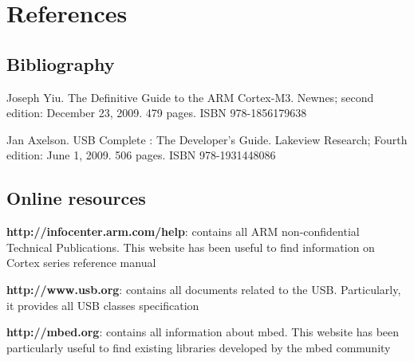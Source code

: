 \documentclass[pdftex,10pt,a4paper]{report}
\newenvironment{packed_item}{
\begin{itemize}
  \setlength{\itemsep}{1pt}
  \setlength{\parskip}{0pt}
  \setlength{\parsep}{0pt}
}{\end{itemize}}
\begin{document}
\chapter*{References}
\section*{Bibliography}
\begin{packed_item}
	\item Joseph Yiu. The Definitive Guide to the ARM Cortex-M3. Newnes; second edition: December 23, 2009. 479 pages. ISBN 978-1856179638
	\item Jan Axelson. USB Complete : The Developer's Guide. Lakeview Research; Fourth edition: June 1, 2009. 506 pages. ISBN 978-1931448086
\end{packed_item}


\section*{Online resources}
\begin{packed_item}
	\item \textbf{http://infocenter.arm.com/help}: contains all ARM non-confidential Technical Publications. This website has been useful to find information on Cortex series reference manual
	\item \textbf{http://www.usb.org}: contains all documents related to the USB. Particularly, it provides all USB classes specification
	\item \textbf{http://mbed.org}: contains all information about mbed. This website has been particularly useful to find existing libraries developed by the mbed community
\end{packed_item}
\end{document}
